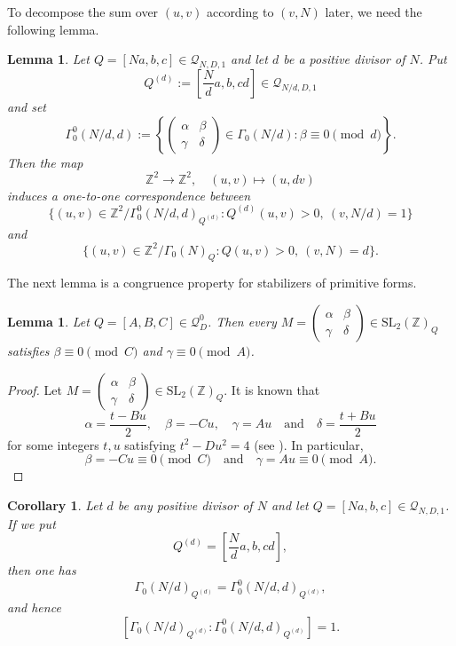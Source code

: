 \documentclass[12pt]{amsart}
\numberwithin{equation}{section}
\newtheorem{lemma}[theorem]{Lemma}
\newtheorem{corollary}[theorem]{Corollary}
\theoremstyle{definition}
\begin{document}
To decompose the sum over $(u,v)$ according to $(v,N)$ later, we need the following lemma.

\begin{lemma}\label{lem}
    Let $Q=[Na,b,c]\in\mathcal{Q}_{N,D,1}$ and let $d$ be a positive divisor of $N$.
    Put
    \[
    Q^{(d)}:=\left[\frac{N}{d}a,b,cd\right]\in\mathcal{Q}_{N/d,D,1}
    \]
    and set
    \[
    \Gamma_{0}^{0}(N/d,d):=\left\{\left(\begin{smallmatrix}
        \alpha & \beta \\ \gamma & \delta
    \end{smallmatrix}\right)\in\Gamma_{0}(N/d):\beta\equiv 0\pmod{d}\right\}.
    \]
    Then the map
    $$\mathbb{Z}^{2}\rightarrow\mathbb{Z}^{2},\quad(u,v)\mapsto(u,dv)$$
    induces a one-to-one correspondence between
    $$\{(u,v)\in\mathbb{Z}^{2}/\Gamma_{0}^{0}(N/d,d)_{Q^{(d)}}:Q^{(d)}(u,v)>0,~(v,N/d)=1\}$$
    and
    $$\{(u,v)\in\mathbb{Z}^{2}/\Gamma_{0}(N)_{Q}:Q(u,v)>0,~(v,N)=d\}.$$
\end{lemma}

The next lemma is a congruence property for stabilizers of primitive forms.

\begin{lemma}\label{lem-stabform}
    Let $Q=[A,B,C]\in\mathcal{Q}_{D}^{0}$. Then every $M=\left(\begin{smallmatrix}
        \alpha & \beta \\ \gamma & \delta
    \end{smallmatrix}\right)\in\mathrm{SL}_{2}(\mathbb{Z})_{Q}$ satisfies $\beta\equiv 0\pmod{C}$ and $\gamma\equiv 0\pmod{A}$.
\end{lemma}

\begin{proof}
    Let $M=\left(\begin{smallmatrix}
        \alpha & \beta \\ \gamma & \delta
    \end{smallmatrix}\right)\in\mathrm{SL}_{2}(\mathbb{Z})_{Q}$. It is known that
    $$\alpha=\frac{t-Bu}{2},\quad\beta=-Cu,\quad\gamma=Au\quad\text{and}\quad\delta=\frac{t+Bu}{2}$$
    for some integers $t,u$ satisfying $t^{2}-Du^{2}=4$ (see \cite[pp. 31--32]{B89}). In particular,
    $$\beta=-Cu\equiv 0\pmod{C}\quad\text{and}\quad\gamma=Au\equiv 0\pmod{A}.$$
\end{proof}

\begin{corollary}\label{cor-indexone}
    Let $d$ be any positive divisor of $N$ and let $Q=[Na,b,c]\in\mathcal{Q}_{N,D,1}$. If we put
    $$Q^{(d)}=\left[\frac{N}{d}a,b,cd\right],$$
    then one has
    $$\Gamma_{0}(N/d)_{Q^{(d)}}=\Gamma_{0}^{0}(N/d,d)_{Q^{(d)}},$$
    and hence
    \begin{equation}\label{eq-indexone}
        [\Gamma_{0}(N/d)_{Q^{(d)}}:\Gamma_{0}^{0}(N/d,d)_{Q^{(d)}}]=1.
    \end{equation}
\end{corollary}
\end{document}
